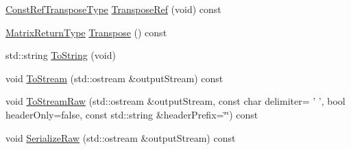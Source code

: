 \begin{DoxyCompactItemize}
\item 
\hyperlink{classvct_dynamic_const_matrix_base_a2ee053ef5a591f470076e2a0c215fa44}{Const\-Ref\-Transpose\-Type} \hyperlink{classvct_dynamic_const_matrix_base_ae3e84ae1226f2711bcc5bcf03497ecc0}{Transpose\-Ref} (void) const 
\item 
\hyperlink{classvct_dynamic_const_matrix_base_aed2ac5b2cf673fab97a67418f8e69646}{Matrix\-Return\-Type} \hyperlink{classvct_dynamic_const_matrix_base_a8e74c50a0cc8f228a89287b82218e2fd}{Transpose} () const 
\item 
std\-::string \hyperlink{classvct_dynamic_const_matrix_base_acf0a7ab83b179fd10e9d8d2c3f225776}{To\-String} (void)
\item 
void \hyperlink{classvct_dynamic_const_matrix_base_a1e37319e20d2ce31505198d20d603913}{To\-Stream} (std\-::ostream \&output\-Stream) const 
\item 
void \hyperlink{classvct_dynamic_const_matrix_base_a7c96887913c708eaa04ec3c2a2ce8713}{To\-Stream\-Raw} (std\-::ostream \&output\-Stream, const char delimiter= ' ', bool header\-Only=false, const std\-::string \&header\-Prefix=\char`\"{}\char`\"{}) const 
\item 
void \hyperlink{classvct_dynamic_const_matrix_base_a837a83daae56896cf332dce9c004a0ed}{Serialize\-Raw} (std\-::ostream \&output\-Stream) const 
\end{DoxyCompactItemize}
